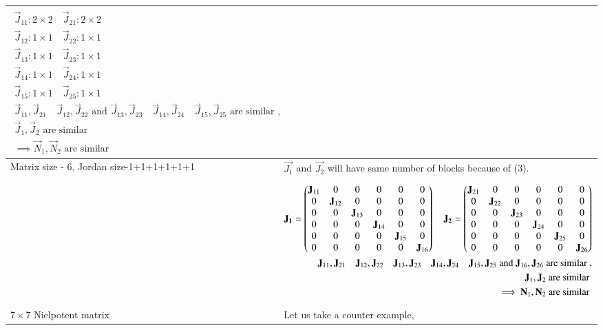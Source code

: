 \begin{longtable}{|p{5cm}|p{13cm}|}
{\begin{align*}
    \vec{J}_{11}: 2\times2 \quad \vec{J}_{21}: 2\times2\\
    \vec{J}_{12}: 1\times1 \quad \vec{J}_{22}: 1\times1\\
    \vec{J}_{13}: 1\times1 \quad \vec{J}_{23}: 1\times1\\
    \vec{J}_{14}: 1\times1 \quad \vec{J}_{24}: 1\times1\\
    \vec{J}_{15}: 1\times1 \quad \vec{J}_{25}: 1\times1\\   
    \vec{J}_{11}, \vec{J}_{21}\quad \vec{J}_{12}, \vec{J}_{22}  \text{ and } \vec{J}_{13}, \vec{J}_{23} \quad \vec{J}_{14}, \vec{J}_{24} \quad \vec{J}_{15}, \vec{J}_{25} \text{ are similar }, \\
    \vec{J}_{1}, \vec{J}_{2} \text{ are similar }\\
    \implies \vec{N}_{1}, \vec{N}_{2} \text{ are similar }
\end{align*}}\\
\hline
Matrix size - 6, Jordan size-1+1+1+1+1+1 & $\vec{J_1}$ and $\vec{J_2}$ will have same number of blocks because of (3).
\\&
\parbox{12cm}{\begin{align*}
    \mathbf{J_1}=\begin{pmatrix}\mathbf{J}_{11}&0&0&0&0&0 \\ 0&\mathbf{J}_{12}&0&0&0&0 \\ 0&0&\mathbf{J}_{13}&0&0&0\\ 0&0&0&\mathbf{J}_{14}&0&0\\ 0&0&0&0&\mathbf{J}_{15}&0\\ 0&0&0&0&0&\mathbf{J}_{16}\end{pmatrix} \quad 
    \mathbf{J_2}=\begin{pmatrix}\mathbf{J}_{21}&0&0&0&0&0 \\ 0&\mathbf{J}_{22}&0&0&0&0 \\ 0&0&\mathbf{J}_{23}&0&0&0\\ 0&0&0&\mathbf{J}_{24}&0&0\\ 0&0&0&0&\mathbf{J}_{25}&0\\ 0&0&0&0&0&\mathbf{J}_{26}\end{pmatrix}\\
    \mathbf{J}_{11}, \mathbf{J}_{21} \quad \mathbf{J}_{12}, \mathbf{J}_{22} \quad \mathbf{J}_{13}, \mathbf{J}_{23} \quad \mathbf{J}_{14}, \mathbf{J}_{24} \quad \mathbf{J}_{15}, \mathbf{J}_{25} \text{ and } \mathbf{J}_{16}, \mathbf{J}_{26} \text{ are similar }, \\
    \mathbf{J}_{1}, \mathbf{J}_{2} \text{ are similar }\\
    \implies \mathbf{N}_{1}, \mathbf{N}_{2} \text{ are similar }
\end{align*}}\\
\hline
$7 \times 7$ Nielpotent matrix & 
Let us take a counter example,\\

\end{longtable}
